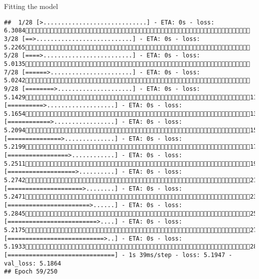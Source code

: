 \documentclass[
  ignorenonframetext,
]{beamer}
\begin{document}
\begin{frame}[fragile]{Fitting the model}
\begin{verbatim}
##  1/28 [>.............................] - ETA: 0s - loss: 6.3084 3/28 [==>...........................] - ETA: 0s - loss: 5.2265 5/28 [====>.........................] - ETA: 0s - loss: 5.0135 7/28 [======>.......................] - ETA: 0s - loss: 5.0242 9/28 [========>.....................] - ETA: 0s - loss: 5.142911/28 [==========>...................] - ETA: 0s - loss: 5.165413/28 [============>.................] - ETA: 0s - loss: 5.209415/28 [===============>..............] - ETA: 0s - loss: 5.219917/28 [=================>............] - ETA: 0s - loss: 5.251119/28 [===================>..........] - ETA: 0s - loss: 5.274221/28 [=====================>........] - ETA: 0s - loss: 5.247123/28 [=======================>......] - ETA: 0s - loss: 5.284525/28 [=========================>....] - ETA: 0s - loss: 5.217527/28 [===========================>..] - ETA: 0s - loss: 5.193328/28 [==============================] - 1s 39ms/step - loss: 5.1947 - val_loss: 5.1864
## Epoch 59/250

\end{verbatim}
\end{frame}
\end{document}
